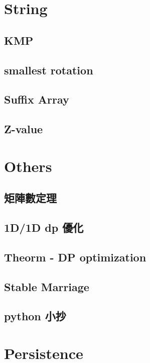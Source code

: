 \section{String}

\subsection{KMP}

\subsection{smallest rotation}

\subsection{Suffix Array}

\subsection{Z-value}


\section{Others}

\subsection{矩陣數定理}

\subsection{1D/1D dp 優化}

\subsection{Theorm - DP optimization}

\subsection{Stable Marriage}

\subsection{python 小抄}



\section{Persistence}

